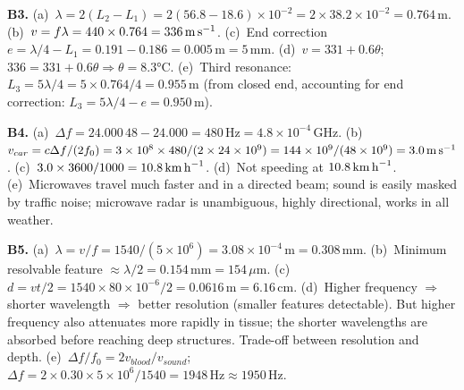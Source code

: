 \textbf{B3.}
(a)~$\lambda=2(L_2-L_1)=2(56.8-18.6)\times10^{-2}
=2\times38.2\times10^{-2}=0.764\,\text{m}$. \quad
(b)~$v=f\lambda=440\times0.764=336\,\text{m\,s}^{-1}$.
\quad
(c)~End correction $e=\lambda/4-L_1
=0.191-0.186=0.005\,\text{m}=5\,\text{mm}$. \quad
(d)~$v=331+0.6\theta$;
$336=331+0.6\theta\Rightarrow\theta=8.3°\text{C}$. \quad
(e)~Third resonance: $L_3=5\lambda/4=5\times0.764/4
=0.955\,\text{m}$ (from closed end, accounting for end
correction: $L_3=5\lambda/4-e=0.950\,\text{m}$).

\textbf{B4.}
(a)~$\Delta f=24.000\,48-24.000=480\,\text{Hz}
=4.8\times10^{-4}\,\text{GHz}$. \quad
(b)~$v_{car}=c\Delta f/(2f_0)
=3\times10^8\times480/(2\times24\times10^9)
=144\times10^9/(48\times10^9)=3.0\,\text{m\,s}^{-1}$. \quad
(c)~$3.0\times3600/1000=10.8\,\text{km\,h}^{-1}$. \quad
(d)~Not speeding at $10.8\,\text{km\,h}^{-1}$. \quad
(e)~Microwaves travel much faster and in a directed beam;
sound is easily masked by traffic noise; microwave
radar is unambiguous, highly directional, works in
all weather.

\textbf{B5.}
(a)~$\lambda=v/f=1540/(5\times10^6)
=3.08\times10^{-4}\,\text{m}=0.308\,\text{mm}$. \quad
(b)~Minimum resolvable feature $\approx\lambda/2
=0.154\,\text{mm}=154\,\mu\text{m}$. \quad
(c)~$d=vt/2=1540\times80\times10^{-6}/2
=0.0616\,\text{m}=6.16\,\text{cm}$. \quad
(d)~Higher frequency $\Rightarrow$ shorter wavelength
$\Rightarrow$ better resolution (smaller features
detectable). But higher frequency also attenuates more
rapidly in tissue; the shorter wavelengths are absorbed
before reaching deep structures. Trade-off between
resolution and depth. \quad
(e)~$\Delta f/f_0=2v_{blood}/v_{sound}$;
$\Delta f=2\times0.30\times5\times10^6/1540
=1948\,\text{Hz}\approx1950\,\text{Hz}$.

\endgroup



